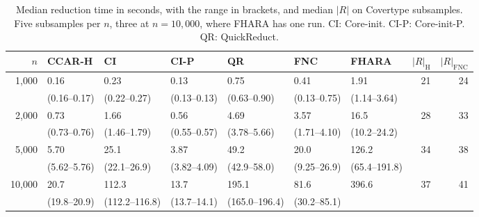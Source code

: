 \begin{table}[!t]
  \caption{Median reduction time in seconds, with the range in brackets, and median $|R|$ on Covertype subsamples. Five subsamples per $n$, three at $n=10{,}000$, where FHARA has one run. CI: Core-init. CI-P: Core-init-P. QR: QuickReduct.}
  \label{tab:external-cov}
  \footnotesize
  \setlength{\tabcolsep}{2pt}
  \begin{tabular*}{\textwidth}{@{\extracolsep{\fill}}rllllllrr@{}}
    \toprule
    $n$ & CCAR-H & CI & CI-P & QR & FNC & FHARA & $|R|_{\mathrm{H}}$ & $|R|_{\mathrm{FNC}}$ \\
    \midrule
    1{,}000 & 0.16 & 0.23 & 0.13 & 0.75 & 0.41 & 1.91 & 21 & 24 \\
     & (0.16--0.17) & (0.22--0.27) & (0.13--0.13) & (0.63--0.90) & (0.13--0.75) & (1.14--3.64) & & \\
    2{,}000 & 0.73 & 1.66 & 0.56 & 4.69 & 3.57 & 16.5 & 28 & 33 \\
     & (0.73--0.76) & (1.46--1.79) & (0.55--0.57) & (3.78--5.66) & (1.71--4.10) & (10.2--24.2) & & \\
    5{,}000 & 5.70 & 25.1 & 3.87 & 49.2 & 20.0 & 126.2 & 34 & 38 \\
     & (5.62--5.76) & (22.1--26.9) & (3.82--4.09) & (42.9--58.0) & (9.25--26.9) & (65.4--191.8) & & \\
    10{,}000 & 20.7 & 112.3 & 13.7 & 195.1 & 81.6 & 396.6 & 37 & 41 \\
     & (19.8--20.9) & (112.2--116.8) & (13.7--14.1) & (165.0--196.4) & (30.2--85.1) &  & & \\
    \bottomrule
  \end{tabular*}
\end{table}
